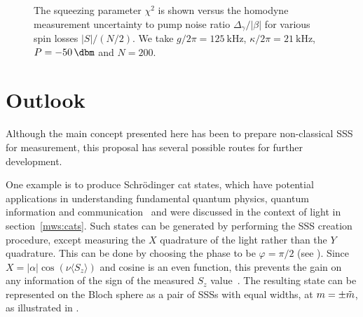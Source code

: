 \begin{figure}[htb]
  \centering
  \caption[Relationship of squeezing parameter to measurement uncertainty]{
    The squeezing parameter $\chi^2$ is shown versus the homodyne
  measurement uncertainty to pump noise ratio $\Delta_\gamma/|\beta|$ for
  various spin losses $|S|/(N/2)$. We take
  $g/2\pi = \SI{125}{\kilo\hertz}$, $\kappa/2\pi = \SI{21}{\kilo\hertz}$,
  $P=\SI{-50}{\dbm}$ and $N=200$.
  }
  \label{squeeze:fig:wineland}
\end{figure}

\section{Outlook}

Although the main concept presented here has been to prepare non-classical SSS
for measurement, this proposal has several possible routes for further
development.

One example is to produce Schr\"odinger cat states, which have potential
applications in understanding fundamental quantum physics, quantum information
and communication~\cite{doi:10.1126/science.aay0600} and were discussed in the
context of light in section~\ref{mws:cats}. Such states can be generated by
performing the SSS creation procedure, except measuring the $X$ quadrature of
the light rather than the $Y$ quadrature. This can be done by choosing the
phase to be $\varphi=\pi/2$ (see ).  Since $X =
|\alpha|\cos(\nu \langle S_z \rangle)$ and cosine is an even function, this
prevents the gain on any information of the sign of the measured $S_z$
value~\cite{PhysRevA.56.2249, Zhang2019}. The resulting state can be
represented on the Bloch sphere as a pair of SSSs with equal widths, at
$m=\pm\tilde{m}$, as illustrated in .

